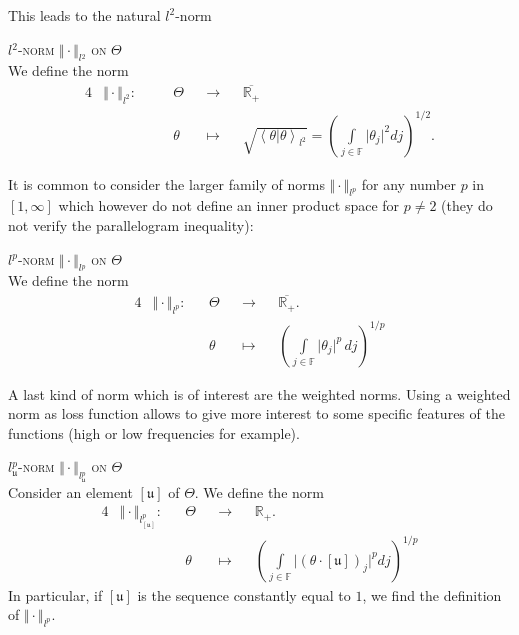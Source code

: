 \begin{Liste}[]
This leads to the natural $l^{2}$-norm
\begin{de}{\textsc{$l^{2}$-norm $\Vert \cdot \Vert_{l^{2}}$ on $\Theta$}\\}\label{DE_INTRO_FREQ_L2THETA}
We define the norm
\begin{alignat*}{4}
& \Vert \cdot \Vert_{l^{2}} : && \quad \Theta && \rightarrow && \overline{\mathds{R}_{+}}\\
& &&\quad \theta && \mapsto && \sqrt{\left\langle \theta \vert \theta \right\rangle_{l^{2}}} = \left(\int\limits_{j \in \mathds{F}} \vert \theta_{j}\vert^{2} dj\right)^{1/2}.
\end{alignat*}
\end{de}

It is common to consider the larger family of norms $\Vert \cdot \Vert_{l^{p}}$ for any number $p$ in $[1, \infty]$ which however do not define an inner product space for $p \neq 2$ (they do not verify the parallelogram inequality):
\begin{de}{\textsc{$l^{p}$-norm $\Vert \cdot \Vert_{l^{p}}$ on $\Theta$}\\}\label{DE_INTRO_FREQ_LPTHETA}
We define the norm
\begin{alignat*}{4}
& \Vert \cdot \Vert_{l^{p}} : && \Theta && \rightarrow && \overline{\mathds{R}_{+}}.\\
& && \theta && \mapsto && \left(\int\limits_{j \in \mathds{F}} \vert \theta_{j} \vert^{p} \, dj\right)^{1/p}
\end{alignat*}
\end{de}

A last kind of norm which is of interest are the weighted norms.
Using a weighted norm as loss function allows to give more interest to some specific features of the functions (high or low frequencies for example).
\begin{de}{\textsc{$l^{p}_{\mathfrak{u}}$-norm $\Vert \cdot \Vert_{l^{p}_{\mathfrak{u}}}$ on $\Theta$}\\}\label{DE_INTRO_FREQ_LPUTHETA}
Consider an element $[\mathfrak{u}]$ of $\Theta$.
We define the norm
\begin{alignat*}{4}
& \Vert \cdot \Vert_{l^{p}_{[\mathfrak{u}]}} : && \Theta && \rightarrow && \mathds{R}_{+}.\\
& && \theta && \mapsto && \left(\int\limits_{j \in \mathds{F}} \vert (\theta \cdot [\mathfrak{u}])_{j}\vert^{p} dj\right)^{1/p}
\end{alignat*}
In particular, if $[\mathfrak{u}]$ is the sequence constantly equal to $1$, we find the definition of $\Vert \cdot \Vert_{l^{p}}$.
\end{de}


\end{Liste}
